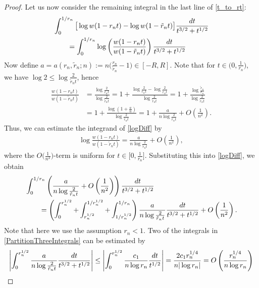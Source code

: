 \documentclass[11pt]{article}
\numberwithin{equation}{section}
\numberwithin{equation}{section}
\begin{document}
\begin{proof}
Let us now consider the remaining integral in the last line of \eqref{t_to_rt}:
\begin{align}\nonumber
& \int_0^{1/r_n} \big[\log w(1-r_n t)- \log w(1-\tilde r_n t)\big] \frac{{\rm d}t}{t^{3/2}+t^{1/2}}
 \\\label{logDiff}
 &\qquad= \int_0^{1/r_n} \log \left(\frac{w(1-r_n t)}{w(1-\tilde r_n t)}\right) \frac{{\rm d}t}{t^{3/2}+t^{1/2}}
\end{align}
Now define $a = a(r_n, \tilde r_n ; n) := n\big(\frac{r_n}{\tilde r_n}-1\big) \in [-R, R]$. Note that for $t \in \big(0, \frac{1}{r_n}\big)$, we have $\log 2 \leq \log \frac{2}{\tilde r_n t}$, hence
\begin{align*}
 \frac{w(1-r_n t)}{w(1-\tilde r_n t)} &= \frac{\log \frac{2}{r_nt}}{\log \frac{2}{\tilde r_nt}} = 1 + \frac{\log \frac{2}{r_nt}-\log \frac{2}{\tilde r_nt}}{\log \frac{2}{\tilde r_nt}} =1 + \frac{\log \frac{\tilde r_n}{r_n}}{\log \frac{2}{\tilde r_n t}}
 \\
 &= 1 + \frac{\log (1+\frac{a}{n})}{\log \frac{2}{\tilde r_n t}}= 1 + \frac{a}{n\log \frac{2}{\tilde r_n t}} + O\left(\frac{1}{n^2}\right).
\end{align*}
Thus, we can estimate the integrand of \eqref{logDiff} by
\begin{align*}
 \log \frac{w(1-r_n t)}{w(1-\tilde r_n t)} = \frac{a}{n\log \frac{2}{\tilde r_n t}} + O\left(\frac{1}{n^2}\right),
\end{align*}
where the $O\big(\frac{1}{n^2}\big)$-term is uniform for $t\in\big[0, \frac{1}{r_n}\big]$. Substituting this into \eqref{logDiff}, we obtain
\begin{align}\nonumber
 &\int_0^{1/r_n} \left(\frac{a}{n\log \frac{2}{\tilde r_n t}} + O\left(\frac{1}{n^2}\right)\right) \frac{{\rm d}t}{t^{3/2}+t^{1/2}}
 \\\label{PartitionThreeIntegrals}
 &\qquad= \left(\int_{0}^{r_n^{1/2}}+\int_{r_n^{1/2}}^{1/r_n^{1/2}}+\int_{1/r_n^{1/2}}^{1/r_n}\right) \frac{a}{n\log \frac{2}{\tilde r_n t}} \frac{{\rm d}t}{t^{3/2}+t^{1/2}}+O\left(\frac{1}{n^2}\right).
\end{align}
Note that here we use the assumption $r_n < 1$.
Two of the integrals in \eqref{PartitionThreeIntegrals} can be estimated by
\begin{align*}
 \left|\int_{0}^{r_n^{1/2}} \frac{a}{n\log \frac{2}{\tilde r_n t}} \frac{{\rm d}t}{t^{3/2}+t^{1/2}} \right| \leq \left|\int_{0}^{r_n^{1/2}} \frac{c_1}{n \log r_n} \frac{{\rm d}t}{t^{1/2}}\right| = \frac{2c_1 r_n^{1/4}}{n |\log r_n|} = O\left(\frac{r_n^{1/4}}{n \log r_n}\right)

\end{align*}
\end{proof}
\end{document}
